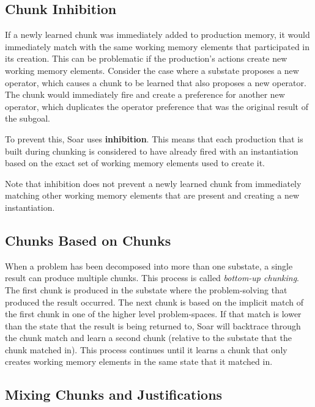 \subsection{Chunk Inhibition}

If a newly learned chunk was immediately added to production memory, it would immediately match with the same working memory elements that participated in its creation.  This can be problematic if the production's actions create new working memory elements.  Consider the case where a substate proposes a new operator, which causes a chunk to be learned that also proposes a new operator. The chunk would immediately fire and create a preference for another new operator, which duplicates the operator preference that was the original result of the subgoal. 

To prevent this, Soar uses \textbf{inhibition}. This means that each production that is built during chunking is considered to have already fired with an instantiation based on the exact set of working memory elements used to create it. 

Note that inhibition does not prevent a newly learned chunk from immediately matching other working memory elements that are present and creating a new instantiation.

\subsection{Chunks Based on Chunks}

When a problem has been decomposed into more than one substate, a single result can produce multiple chunks.  This process is called \textit{bottom-up chunking}.  The first chunk is produced in the substate where the problem-solving that produced the result occurred.  The next chunk is based on the implicit match of the first chunk in one of the higher level problem-spaces.  If that match is lower than the state that the result is being returned to, Soar will backtrace through the chunk match and learn a second chunk (relative to the substate that the chunk matched in).  This process continues until it learns a chunk that only creates working memory elements in the same state that it matched in.

\subsection{Mixing Chunks and Justifications}
 
